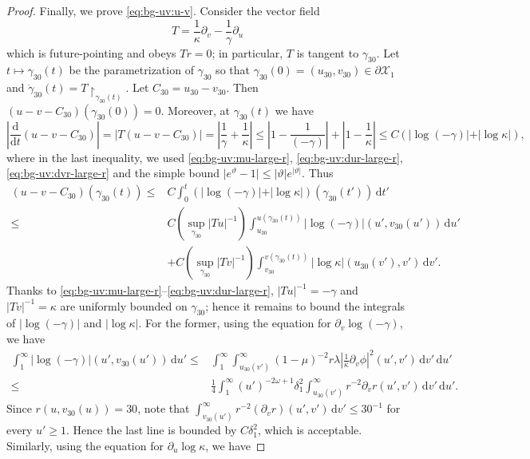 \documentclass[10pt, reqno]{amsart}
\theoremstyle{definition}
\theoremstyle{remark}
\theoremstyle{conjecture}
\numberwithin{equation}{section}
\newcommand{\abs}[1]{\vert#1\vert}
\newcommand{\ud}{\mathrm{d}}
\newcommand{\rd}{\partial}
\newcommand{\0}{\emptyset}
\newcommand{\gmm}{\gamma}
\newcommand{\dlt}{\delta}
\newcommand{\kpp}{\kappa}
\newcommand{\lmb}{\lambda}
\newcommand{\vtht}{\vartheta}
\newcommand{\omg}{\omega}
\newcommand{\calX}{\mathcal X}
\newcommand{\dvr}{\lmb}
\newcommand{\Abs}[1]{\left\vert #1 \right\vert}
\begin{document}
\begin{proof}
Finally, we prove \eqref{eq:bg-uv:u-v}. Consider the vector field 
\begin{equation*}
T = \frac{1}{\kpp} \rd_{v} - \frac{1}{\gmm} \rd_{u}
\end{equation*}
which is future-pointing and obeys $T r = 0$; in particular, $T$ is tangent to $\gmm_{30}$. Let $t \mapsto \gmm_{30}(t)$ be the parametrization of $\gmm_{30}$ so that $\gmm_{30}(0) = (u_{30}, v_{30}) \in \rd \calX_{1}$ and $\dot{\gmm}_{30}(t) = T \restriction_{\gmm_{30}(t)}$. Let $C_{30} = u_{30} - v_{30}$. Then $(u - v - C_{30})(\gmm_{30}(0)) = 0$. Moreover, at $\gmm_{30}(t)$ we have
\begin{equation*}
	\Abs{\frac{\ud}{\ud t} (u - v - C_{30})}
	= \abs{T (u - v - C_{30})}
	= \Abs{\frac{1}{\gmm} + \frac{1}{\kpp}}
	\leq \Abs{1 - \frac{1}{(-\gmm)}} + \Abs{1 - \frac{1}{\kpp}}
	\leq C (\abs{\log (-\gmm)} + \abs{\log \kpp}) ,
\end{equation*}
where in the last inequality, we used \eqref{eq:bg-uv:mu-large-r}, \eqref{eq:bg-uv:dur-large-r}, \eqref{eq:bg-uv:dvr-large-r} and the simple bound $\abs{e^{\vtht} - 1} \leq \abs{\vtht} e^{\abs{\vtht}}$. Thus 
\begin{align*}
	(u - v - C_{30})(\gmm_{30}(t))
	\leq & C \int_{0}^{t} (\abs{\log (-\gmm)} + \abs{\log \kpp})(\gmm_{30}(t')) \, \ud t' \\
	\leq & C \left(\sup_{\gmm_{30}} \abs{T u}^{-1} \right) \int_{u_{30}}^{u(\gmm_{30}(t))} \abs{\log (-\gmm)} (u', v_{30}(u')) \, \ud u' \\
	& + C \left(\sup_{\gmm_{30}} \abs{T v}^{-1} \right) \int_{v_{30}}^{v(\gmm_{30}(t))} \abs{\log \kpp} (u_{30}(v'), v') \, \ud v'. 
\end{align*}
Thanks to \eqref{eq:bg-uv:mu-large-r}--\eqref{eq:bg-uv:dur-large-r}, $\abs{T u}^{-1} = -\gmm$ and $\abs{T v}^{-1} = \kpp$ are uniformly bounded on $\gmm_{30}$; hence it remains to bound the integrals of $\abs{\log (-\gmm)}$ and $\abs{\log \kpp}$. For the former, using the equation for $\rd_{v} \log(-\gmm)$, we have
\begin{align*}
	\int_{1}^{\infty} \abs{\log (-\gmm)} (u', v_{30}(u')) \, \ud u' 
	\leq & \int_{1}^{\infty} \int_{u_{30}(v')}^{\infty} (1-\mu)^{-2} r \dvr \Abs{\frac{1}{\kpp} \rd_{v} \phi}^{2}(u', v') \, \ud v' \, \ud u' \\
	\leq & \frac{1}{4} \int_{1}^{\infty} (u')^{-2 \omg +1} \dlt_{1}^{2} \int_{u_{30}(v')}^{\infty} r^{-2} \rd_{v} r (u', v') \, \ud v' \, \ud u' .
\end{align*}
Since $r(u, v_{30}(u)) = 30$, note that $\int_{v_{30}(u')}^{\infty} r^{-2}(\rd_{v} r)(u', v') \, \ud v' \leq 30^{-1}$ for every $u' \geq 1$. Hence the last line is bounded by $C \dlt_{1}^{2}$, which is acceptable. Similarly, using the equation for $\rd_{u} \log \kpp$, we have

\end{proof}
\end{document}
